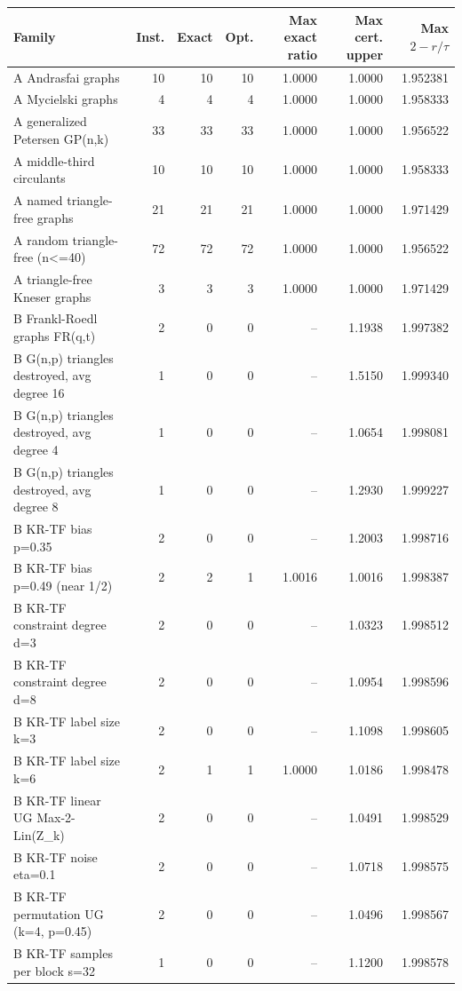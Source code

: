 \begin{tabular}{lrrrrrr}
\toprule
Family & Inst. & Exact & Opt. & Max exact ratio & Max cert. upper & Max $2-r/\tau$ \\
\midrule
A Andrasfai graphs & 10 & 10 & 10 & 1.0000 & 1.0000 & 1.952381 \\
A Mycielski graphs & 4 & 4 & 4 & 1.0000 & 1.0000 & 1.958333 \\
A generalized Petersen GP(n,k) & 33 & 33 & 33 & 1.0000 & 1.0000 & 1.956522 \\
A middle-third circulants & 10 & 10 & 10 & 1.0000 & 1.0000 & 1.958333 \\
A named triangle-free graphs & 21 & 21 & 21 & 1.0000 & 1.0000 & 1.971429 \\
A random triangle-free (n<=40) & 72 & 72 & 72 & 1.0000 & 1.0000 & 1.956522 \\
A triangle-free Kneser graphs & 3 & 3 & 3 & 1.0000 & 1.0000 & 1.971429 \\
B Frankl-Roedl graphs FR(q,t) & 2 & 0 & 0 & -- & 1.1938 & 1.997382 \\
B G(n,p) triangles destroyed, avg degree 16 & 1 & 0 & 0 & -- & 1.5150 & 1.999340 \\
B G(n,p) triangles destroyed, avg degree 4 & 1 & 0 & 0 & -- & 1.0654 & 1.998081 \\
B G(n,p) triangles destroyed, avg degree 8 & 1 & 0 & 0 & -- & 1.2930 & 1.999227 \\
B KR-TF bias p=0.35 & 2 & 0 & 0 & -- & 1.2003 & 1.998716 \\
B KR-TF bias p=0.49 (near 1/2) & 2 & 2 & 1 & 1.0016 & 1.0016 & 1.998387 \\
B KR-TF constraint degree d=3 & 2 & 0 & 0 & -- & 1.0323 & 1.998512 \\
B KR-TF constraint degree d=8 & 2 & 0 & 0 & -- & 1.0954 & 1.998596 \\
B KR-TF label size k=3 & 2 & 0 & 0 & -- & 1.1098 & 1.998605 \\
B KR-TF label size k=6 & 2 & 1 & 1 & 1.0000 & 1.0186 & 1.998478 \\
B KR-TF linear UG Max-2-Lin(Z\_k) & 2 & 0 & 0 & -- & 1.0491 & 1.998529 \\
B KR-TF noise eta=0.1 & 2 & 0 & 0 & -- & 1.0718 & 1.998575 \\
B KR-TF permutation UG (k=4, p=0.45) & 2 & 0 & 0 & -- & 1.0496 & 1.998567 \\
B KR-TF samples per block s=32 & 1 & 0 & 0 & -- & 1.1200 & 1.998578 \\

\end{tabular}

